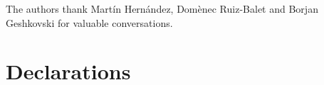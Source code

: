 \documentclass[pdflatex,sn-mathphys-num]{sn-jnl}%
\theoremstyle{thmstyleone}%
\theoremstyle{thmstyletwo}%
\theoremstyle{thmstylethree}%
\numberwithin{equation}{section}
\begin{document}


The authors thank Martín Hernández, Domènec Ruiz-Balet and Borjan Geshkovski for valuable conversations.



\section*{Declarations}

\end{document}

